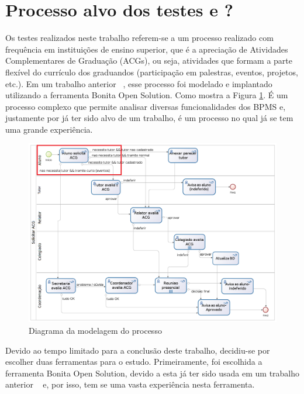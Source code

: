 \documentclass[12pt]{article}
\begin{document}






\section{Processo alvo dos testes e ?}
Os testes realizados neste trabalho referem-se a um processo realizado com frequência em instituições de ensino superior, que é a apreciação de Atividades Complementares de Graduação (ACGs), ou seja, atividades que formam a parte flexível do currículo dos graduandos (participação em palestras, eventos, projetos, etc.). Em um trabalho anterior ~\cite{sbsi2013}, esse processo foi modelado e implantado utilizando a ferramenta Bonita Open Solution. Como mostra a Figura \ref{fig:diagrama}. É um processo complexo que permite analisar diversas funcionalidades dos BPMS e, justamente por já ter sido alvo de um trabalho, é um processo no qual já se tem uma grande experiência.

\begin{figure}[ht]
\centering
\includegraphics[width=.99\textwidth]{imagens/processo.png}
\caption{Diagrama da modelagem do processo}
\label{fig:diagrama}
\end{figure}

Devido ao tempo limitado para a conclusão deste trabalho, decidiu-se por escolher duas ferramentas para o estudo. Primeiramente, foi escolhida a ferramenta Bonita Open Solution, devido a esta já ter sido usada em um trabalho anterior ~\cite{sbsi2013} e, por isso, tem se uma vasta experiência nesta ferramenta.
\end{document}
